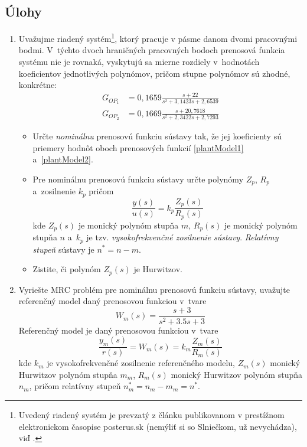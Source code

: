 \documentclass[a4paper, 10pt, ]{article}
\begin{document}
\subsection{Úlohy}


\begin{enumerate}[leftmargin=0pt, labelsep=4mm, itemsep=0pt]

    \item Uvažujme riadený systém\footnote{Uvedený riadený systém je prevzatý z článku publikovanom v prestížnom elektronickom časopise posterus.sk (nemýliť si so Slniečkom, už nevychádza), viď \cite{Tarnik2011}.}, ktorý pracuje v pásme danom dvomi pracovnými bodmi. V~týchto dvoch hraničných pracovných bodoch prenosová funkcia systému nie je rovnaká, vyskytujú sa mierne rozdiely v~hodnotách koeficientov jednotlivých polynómov, pričom stupne polynómov sú zhodné, konkrétne:
    \begin{align}
    	G_{OP_1} &= 0,1659 \frac{s + 22}{ s^2 + 3,1423 s + 2,6539} 	\label{plantModel1}\\
    	G_{OP_2} &= 0,1669 \frac{s + 20,7618}{s^2 + 2,3422s + 2,7293} \label{plantModel2}
    \end{align}
    \begin{itemize}[leftmargin=0pt, labelsep=4mm, itemsep=0pt]
    	\item Určte \emph{nominálnu} prenosovú funkciu sústavy tak, že jej koeficienty sú priemery hodnôt oboch prenosových funkcií \eqref{plantModel1} a~\eqref{plantModel2}.

    	\item Pre nominálnu prenosovú funkciu sústavy určte polynómy $Z_p$, $R_p$ a~zosilnenie $k_p$ pričom
    	\begin{equation} \label{C_PFsustavy_MRCp}
    	       \frac{y(s)}{u(s)} = k_p \frac{Z_p(s)}{R_p(s)}
        \end{equation}
        kde $Z_p(s)$ je monický  polynóm stupňa $m$, $R_p(s)$ je monický polynóm stupňa $n$ a~$k_p$ je tzv. \emph{vysokofrekvenčné zosilnenie sústavy}. \emph{Relatívny stupeň} sústavy je $n^* = n - m$.

        \item Zistite, či polynóm $Z_p(s)$ je Hurwitzov.
    \end{itemize}



    \item Vyriešte MRC problém pre nominálnu prenosovú funkciu sústavy, uvažujte referenčný model daný prenosovou funkciou v~tvare
    \begin{equation}
    	W_m(s) = \frac{s + 3}{ s^2 + 3.5 s + 3}
    \end{equation}
    Referenčný model je daný prenosovou funkciou v~tvare
    \begin{equation} \label{C_RefModelMRCp}
    	\frac{y_m(s)}{r(s)} = W_m(s) = k_m \frac{Z_m(s)}{R_m(s)}
    \end{equation}
    kde $k_m$ je vysokofrekvenčné zosilnenie referenčného modelu, $Z_m(s)$ monický Hurwitzov polynóm stupňa $m_m$, $R_m(s)$ monický Hurwitzov polynóm stupňa $n_m$, pričom relatívny stupeň $n^*_m = n_m - m_m = n^*$.


\end{enumerate}
\end{document}
